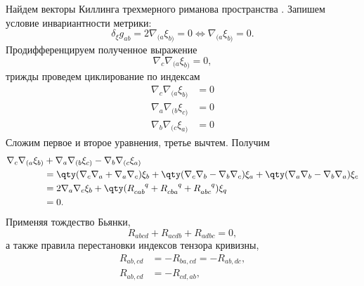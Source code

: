     Найдем векторы Киллинга трехмерного риманова пространства \cite{symmetry_and_killing_fields}. Запишем условие инвариантности метрики:
    \begin{equation}
        \delta_\xi g_{ab}
            = 2 \nabla_{(a} \xi_{b)}
            = 0
            \Leftrightarrow \nabla_{(a} \xi_{b)} = 0.
    \end{equation}
    Продифференцируем полученное выражение
    \begin{equation}
        \nabla_c \nabla_{(a} \xi_{b)} = 0,
    \end{equation}
    трижды проведем циклирование по индексам
    \begin{equation}\begin{aligned}
        \nabla_c \nabla_{(a} \xi_{b)} &= 0 \\
        \nabla_a \nabla_{(b} \xi_{c)} &= 0 \\
        \nabla_b \nabla_{(c} \xi_{a)} &= 0
    \end{aligned}\end{equation}
    Сложим первое и второе уравнения, третье вычтем. Получим
    \begin{equation}\begin{aligned}
        \nabla_c \nabla_{(a} \xi_{b)} &+
        \nabla_a \nabla_{(b} \xi_{c)} -
        \nabla_b \nabla_{(c} \xi_{a)} \\
            &=  \qty( \nabla_c \nabla_a + \nabla_a \nabla_c ) \xi_b +
                \qty( \nabla_c \nabla_b - \nabla_b \nabla_c ) \xi_a +
                \qty( \nabla_a \nabla_b - \nabla_b \nabla_a ) \xi_c \\
            &= 2 \nabla_a \nabla_c \xi_b + \qty(
                R_{cab}^{\hphantom{cab}q} +
                R_{cba}^{\hphantom{cba}q} +
                R_{abc}^{\hphantom{abc}q}
            ) \xi_q \\
            &= 0 .
    \end{aligned}\end{equation}
    Применяя тождество Бьянки,
    \begin{equation}
        R_{abcd} + R_{acdb} + R_{adbc} = 0,
    \end{equation}
    а также правила перестановки индексов тензора кривизны,
    \begin{equation}\begin{aligned}
        R_{ab,cd} &= - R_{ba,cd} = - R_{ab,dc}, \\
        R_{ab,cd} &= - R_{cd,ab}, \\
    \end{aligned}\end{equation}
